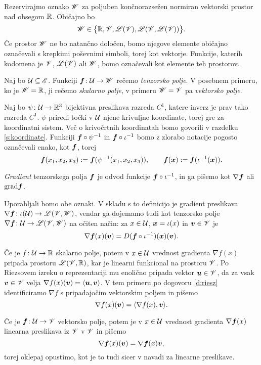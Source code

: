 Rezervirajmo oznako $\mathscr W$ za poljuben končnorazsežen normiran vektorski
prostor nad obsegom $\mathbb R$. Običajno bo
\[ \mathscr W\in\big\{ \mathbb R,\mathscr V,\mathscr L(\mathscr V),\mathscr L(\mathscr V,\mathscr L(\mathscr V)) \big\}. \]
Če prostor $\mathscr W$ ne bo natančno določen, bomo njegove elemente običajno označevali s krepkimi poševnimi simboli, torej kot vektorje.
Funkcije, katerih kodomena je $\mathscr V$, $\mathscr L(\mathscr V)$ ali $\mathscr W$, bomo označevali kot elemente teh prostorov.

Naj bo $\mathcal U\subseteq\mathscr E$. Funkciji $\boldsymbol f\colon \mathcal U\to\mathscr W$ rečemo \emph{tenzorsko polje}.
V posebnem primeru, ko je $\mathscr W=\mathbb R$, ji rečemo \emph{skalarno polje},
v primeru $\mathscr W=\mathscr V$ pa \emph{vektorsko polje}.

Naj bo $\psi\colon \mathcal U\to\mathbb R^3$ bijektivna preslikava razreda $C^1$, katere inverz je prav tako
razreda $C^1$. $\psi$ priredi točki v $\mathcal U$ njene krivuljne koordinate, torej gre za koordinatni sistem.
Več o krivočrtnih koordinatah bomo govorili v razdelku \ref{s:koordinate}.
Funkciji $\boldsymbol f\circ\psi^{-1}$ in $\boldsymbol f\circ\iota^{-1}$ bomo z zlorabo notacije pogosto
označevali enako, kot $\boldsymbol f$, torej
\[
	\boldsymbol f(x_1,x_2,x_3):=\boldsymbol f(\psi^{-1}(x_1,x_2,x_3)),\qquad
	\boldsymbol f(\boldsymbol x):=\boldsymbol f(\iota^{-1}(\boldsymbol x)).
\]

\begin{definicija}
	\emph{Gradient} tenzorskega polja $\boldsymbol f$ je odvod funkcije $\boldsymbol f\circ\iota^{-1}$,
	in ga pišemo kot $\nabla\boldsymbol f$ ali $\mathrm{grad}\boldsymbol f$.
\end{definicija}
Uporabljali bomo obe oznaki. V skladu s to definicijo je gradient preslikava
$\nabla\boldsymbol f\colon\iota(\mathcal U)\to\mathscr L(\mathscr V,\mathscr W)$, vendar ga dojemamo tudi kot tenzorsko polje
$\nabla\boldsymbol f\colon\mathcal U\to\mathscr L(\mathscr V,\mathscr W)$ na očiten način: za $x\in \mathcal U$,
$\boldsymbol x=\iota(x)$ in $\boldsymbol v\in\mathscr V$ je
\[
	\nabla\boldsymbol f(x)(\boldsymbol v)=D(\boldsymbol f\circ\iota^{-1})(\boldsymbol x)(\boldsymbol v).
\]

Če je $f\colon \mathcal U\to\mathbb R$ skalarno polje, potem v $x\in \mathcal U$ vrednost gradienta $\nabla f(x)$
pripada prostoru $\mathscr L(\mathscr V,\mathbb R)$, kar je linearni funkcional na prostoru $\mathscr V$. Po Riezsovem
izreku o reprezentaciji mu enolično pripada vektor $\boldsymbol u\in\mathscr V$, da za vsak
$\boldsymbol v\in\mathscr V$ velja $\nabla f(x)(\boldsymbol v)=\langle\boldsymbol u,\boldsymbol v\rangle$. V tem primeru po
dogovoru \ref{d:riesz} identificiramo $\nabla f$ s pripadajočim vektorskim poljem in pišemo
\[ \nabla f(x)(\boldsymbol v)=\langle\nabla f(x),\boldsymbol v\rangle. \]

Če je $\boldsymbol f\colon \mathcal U\to\mathscr V$ vektorsko polje, potem je v $x\in \mathcal U$ vrednost gradienta $\nabla\boldsymbol f(x)$
linearna preslikava iz $\mathscr V$ v $\mathscr V$ in pišemo
\[ \nabla\boldsymbol f(x)(\boldsymbol v)=\nabla\boldsymbol f(x)\boldsymbol v, \]
torej oklepaj opustimo, kot je to tudi sicer v navadi za linearne preslikave.

